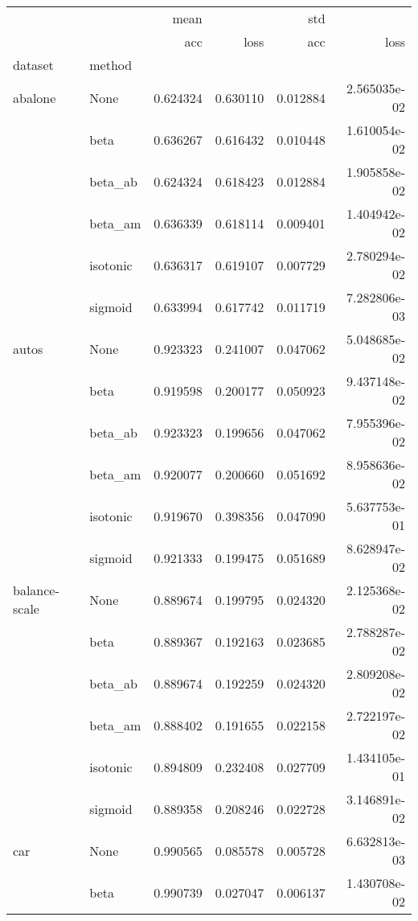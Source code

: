 \begin{tabular}{llrrrr}
\toprule
        &      &      mean &           &       std &               \\
        &      &       acc &      loss &       acc &          loss \\
dataset & method &           &           &           &               \\
\midrule
abalone & None &  0.624324 &  0.630110 &  0.012884 &  2.565035e-02 \\
        & beta &  0.636267 &  0.616432 &  0.010448 &  1.610054e-02 \\
        & beta\_ab &  0.624324 &  0.618423 &  0.012884 &  1.905858e-02 \\
        & beta\_am &  0.636339 &  0.618114 &  0.009401 &  1.404942e-02 \\
        & isotonic &  0.636317 &  0.619107 &  0.007729 &  2.780294e-02 \\
        & sigmoid &  0.633994 &  0.617742 &  0.011719 &  7.282806e-03 \\
autos & None &  0.923323 &  0.241007 &  0.047062 &  5.048685e-02 \\
        & beta &  0.919598 &  0.200177 &  0.050923 &  9.437148e-02 \\
        & beta\_ab &  0.923323 &  0.199656 &  0.047062 &  7.955396e-02 \\
        & beta\_am &  0.920077 &  0.200660 &  0.051692 &  8.958636e-02 \\
        & isotonic &  0.919670 &  0.398356 &  0.047090 &  5.637753e-01 \\
        & sigmoid &  0.921333 &  0.199475 &  0.051689 &  8.628947e-02 \\
balance-scale & None &  0.889674 &  0.199795 &  0.024320 &  2.125368e-02 \\
        & beta &  0.889367 &  0.192163 &  0.023685 &  2.788287e-02 \\
        & beta\_ab &  0.889674 &  0.192259 &  0.024320 &  2.809208e-02 \\
        & beta\_am &  0.888402 &  0.191655 &  0.022158 &  2.722197e-02 \\
        & isotonic &  0.894809 &  0.232408 &  0.027709 &  1.434105e-01 \\
        & sigmoid &  0.889358 &  0.208246 &  0.022728 &  3.146891e-02 \\
car & None &  0.990565 &  0.085578 &  0.005728 &  6.632813e-03 \\
        & beta &  0.990739 &  0.027047 &  0.006137 &  1.430708e-02 \\

\end{tabular}
